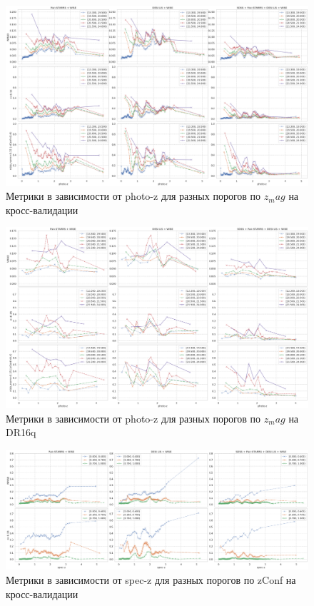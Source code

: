 \documentclass[fleqn,usenatbib]{mnras}
\begin{document}
\begin{landscape}
\begin{figure}
    \centering
    \includegraphics[width=0.9\linewidth]{images/metrics-adv-photoz-x-zmag-cv2.png}
    \caption{Метрики в зависимости от photo-z для разных порогов по $z_mag$ на кросс-валидации}
    \label{fig:my_label}
\end{figure}
\end{landscape}


\begin{landscape}
\begin{figure}
    \centering
    \includegraphics[width=0.9\linewidth]{images/metrics-adv-photoz-x-zmag-dr16q.png}
    \caption{Метрики в зависимости от photo-z для разных порогов по $z_mag$ на DR16q}
    \label{fig:my_label}
\end{figure}
\end{landscape}


\begin{landscape}
\begin{figure}
    \centering
    \includegraphics[width=0.9\linewidth]{images/metrics-adv-zspec-x-zconf-cv2.png}
    \caption{Метрики в зависимости от spec-z для разных порогов по zConf на кросс-валидации}
    \label{fig:my_label}
\end{figure}
\end{landscape}
\end{document}
